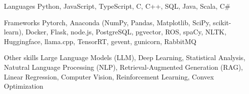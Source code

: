 
\begin{cvskills}
  \cvskill
    {Languages} %
    {Python, JavaScript, TypeScript, C, C++, SQL, Java, Scala, C\#} %

  \cvskill
    {Frameworks} %
    {Pytorch, Anaconda (NumPy, Pandas, Matplotlib, SciPy, scikit-learn), Docker, Flask, node.js, PostgreSQL, pgvector, ROS, spaCy, NLTK, Huggingface, llama.cpp, TensorRT, gevent, gunicorn, RabbitMQ} %

  \cvskill
  {Other skills}
  {Large Language Models (LLM), Deep Learning, Statistical Analysis, Natutral Language Processing (NLP), Retrieval-Augmented Generation (RAG), Linear Regression, Computer Vision, Reinforcement Learning, Convex Optimization}
\end{cvskills}
